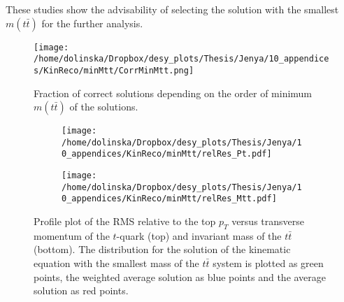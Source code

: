 These studies show the advisability of selecting the
solution with the smallest $m(t\bar{t})$ for the further analysis.

\begin{figure}[t]
  \centering
  \texttt{[image: /home/dolinska/Dropbox/desy\_plots/Thesis/Jenya/10\_appendices/KinReco/minMtt/CorrMinMtt.png]}
  \caption{Fraction of correct solutions depending on the order of minimum $m(t\bar{t})$ of the solutions.}
  \label{fig:corrMinMtt}
\end{figure}

\begin{figure}[h]
\centering
\begin{subfigure}
  \centering
  \texttt{[image: /home/dolinska/Dropbox/desy\_plots/Thesis/Jenya/10\_appendices/KinReco/minMtt/relRes\_Pt.pdf]}
\end{subfigure}
\begin{subfigure}
  \centering
  \texttt{[image: /home/dolinska/Dropbox/desy\_plots/Thesis/Jenya/10\_appendices/KinReco/minMtt/relRes\_Mtt.pdf]}
\end{subfigure}
\caption{Profile plot of the RMS relative to the top $p_{T}$ versus transverse momentum of the $t$-quark (top) and invariant mass of the $t\bar{t}$ (bottom). The distribution for the
         solution of the kinematic equation with the smallest mass of the $t\bar{t}$ system is plotted as green points, the weighted average solution as blue points and the average 
         solution as red points.}
\label{fig:Absvs}
\end{figure}